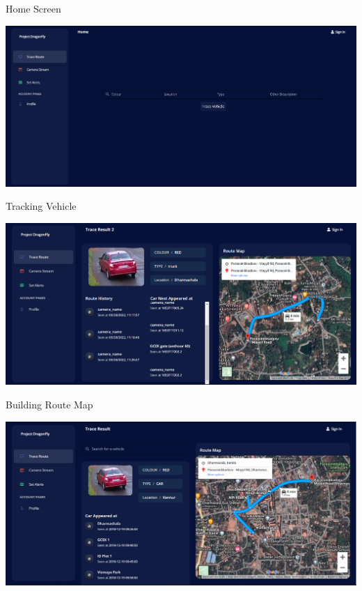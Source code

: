 \documentclass{beamer}
\begin{document}
	\begin{frame}{Home Screen}
		\begin{center}
			\includegraphics[width=\linewidth]{res/home.png}
		\end{center}
	\end{frame}

 
	 \begin{frame}{Tracking Vehicle}
	 	\begin{center}
	 		\includegraphics[width=\linewidth]{res/tracing.png}
	 	\end{center}
	 \end{frame}
 
	 \begin{frame}{Building Route Map}
		\begin{center}
			\includegraphics[width=\linewidth]{res/result.png}
		\end{center}
	\end{frame}
\end{document}
